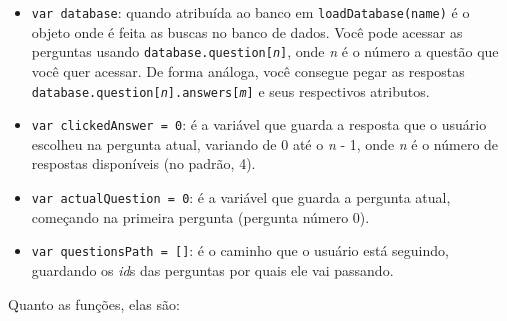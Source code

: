\documentclass{article}
\begin{document}
\begin{itemize}

\item \texttt{var database}: quando atribuída ao banco em \texttt{loadDatabase(name)} é o objeto onde é feita as buscas no banco de dados. Você pode acessar as perguntas usando \texttt{database.question[\textit{n}]}, onde \textit{n} é o número a questão que você quer acessar. De forma análoga, você consegue pegar as respostas \texttt{database.question[\textit{n}].answers[\textit{m}]} e seus respectivos atributos.

\item \texttt{var clickedAnswer = 0}: é a variável que guarda a resposta que o usuário escolheu na pergunta atual, variando de 0 até o \textit{n} - 1, onde \textit{n} é o número de respostas disponíveis (no padrão, 4).

\item \texttt{var actualQuestion = 0}: é a variável que guarda a pergunta atual, começando na primeira pergunta (pergunta número 0).

\item \texttt{var questionsPath = []}: é o caminho que o usuário está seguindo, guardando os \textit{id}s das perguntas por quais ele vai passando.

\end{itemize}

Quanto as funções, elas são:
\end{document}
